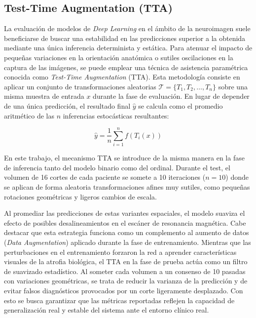 \documentclass[12pt, oneside, english, spanish]{book}
\begin{document}
\subsection{Test-Time Augmentation (TTA)} \label{subsubsec:teoria_tta}

La evaluación de modelos de \textit{Deep Learning} en el ámbito de la neuroimagen suele beneficiarse de buscar una estabilidad en las predicciones superior a la obtenida mediante una única inferencia determinista y estática. Para atenuar el impacto de pequeñas variaciones en la orientación anatómica o sutiles oscilaciones en la captura de las imágenes, se puede emplear una técnica de asistencia paramétrica conocida como \textit{Test-Time Augmentation} (TTA). Esta metodología consiste en aplicar un conjunto de transformaciones aleatorias $\mathcal{T} = \{T_1, T_2, \dots, T_n\}$ sobre una misma muestra de entrada $x$ durante la fase de evaluación. En lugar de depender de una única predicción, el resultado final $\hat{y}$ se calcula como el promedio aritmético de las $n$ inferencias estocásticas resultantes:

\begin{equation}
	\hat{y} = \frac{1}{n} \sum_{i=1}^{n} f(T_i(x))
\end{equation}

En este trabajo, el mecanismo TTA se introduce de la misma manera en la fase de inferencia tanto del modelo binario como del ordinal. Durante el test, el volumen de 16 cortes de cada paciente se somete a 10 iteraciones ($n=10$) donde se aplican de forma aleatoria transformaciones afines muy sutiles, como pequeñas rotaciones geométricas y ligeros cambios de escala.

Al promediar las predicciones de estas variantes espaciales, el modelo suaviza el efecto de posibles desalineamientos en el escáner de resonancia magnética. Cabe destacar que esta estrategia funciona como un complemento al aumento de datos (\textit{Data Augmentation}) aplicado durante la fase de entrenamiento. Mientras que las perturbaciones en el entrenamiento forzaron la red a aprender características visuales de la atrofia biológica, el TTA en la fase de prueba actúa como un filtro de suavizado estadístico. Al someter cada volumen a un consenso de 10 pasadas con variaciones geométricas, se trata de reducir la varianza de la predicción y de evitar falsos diagnósticos provocados por un corte ligeramente desplazado. Con esto se busca garantizar que las métricas reportadas reflejen la capacidad de generalización real y estable del sistema ante el entorno clínico real.
\end{document}
